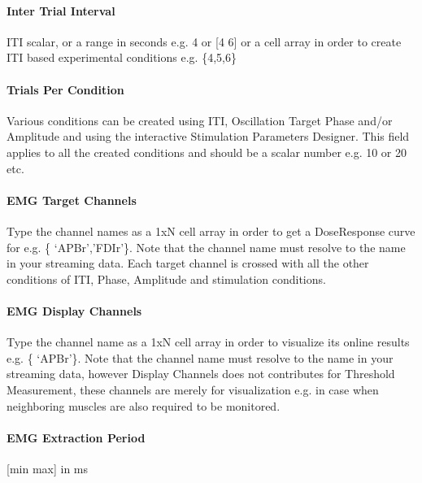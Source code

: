 \documentclass[letterpaper,10pt,english]{sphinxmanual}
\begin{document}
\paragraph{Inter Trial Interval}
\label{\detokenize{8_MEPDoseResponseCurve:inter-trial-interval}}
\sphinxAtStartPar
ITI scalar, or a range in seconds e.g. 4 or {[}4 6{]} or a cell array in order to create ITI based experimental conditions e.g. \{4,5,6\}


\paragraph{Trials Per Condition}
\label{\detokenize{8_MEPDoseResponseCurve:trials-per-condition}}
\sphinxAtStartPar
Various conditions can be created using ITI, Oscillation Target Phase and/or Amplitude and using the interactive Stimulation Parameters Designer. This field applies to all the created conditions and should be a scalar number e.g. 10 or 20 etc.


\paragraph{EMG Target Channels}
\label{\detokenize{8_MEPDoseResponseCurve:emg-target-channels}}
\sphinxAtStartPar
Type the channel names as a 1xN cell array in order to get a Dose\sphinxhyphen{}Response curve for e.g. \{ ‘APBr’,’FDIr’\}. Note that the channel name must resolve to the name in your streaming data. Each target channel is crossed with all the other conditions of ITI, Phase, Amplitude and stimulation conditions.


\paragraph{EMG Display Channels}
\label{\detokenize{8_MEPDoseResponseCurve:emg-display-channels}}
\sphinxAtStartPar
Type the channel name as a 1xN cell array in order to visualize its online results e.g. \{ ‘APBr’\}. Note that the channel name must resolve to the name in your streaming data, however Display Channels does not contributes for Threshold Measurement, these channels are merely for visualization e.g. in case when neighboring muscles are also required to be monitored.


\paragraph{EMG Extraction Period}
\label{\detokenize{8_MEPDoseResponseCurve:emg-extraction-period}}
\sphinxAtStartPar
{[}min max{]} in ms
\end{document}
